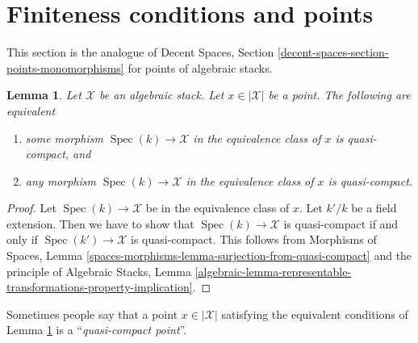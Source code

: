 \documentclass{stacks-project}
\theoremstyle{plain}
\newtheorem{lemma}[subsection]{Lemma}
\theoremstyle{definition}
\theoremstyle{remark}
\numberwithin{equation}{subsection}
\def\Spec{\mathop{\mathrm{Spec}}}
\begin{document}
\section{Finiteness conditions and points}
\label{section-points-conditions}

\noindent
This section is the analogue of
Decent Spaces, Section \ref{decent-spaces-section-points-monomorphisms}
for points of algebraic stacks.

\begin{lemma}
\label{lemma-UR-quasi-compact-above-x}
Let $\mathcal{X}$ be an algebraic stack. Let $x \in |\mathcal{X}|$
be a point. The following are equivalent
\begin{enumerate}
\item some morphism $\Spec(k) \to \mathcal{X}$ in the equivalence
class of $x$ is quasi-compact, and
\item any morphism $\Spec(k) \to \mathcal{X}$ in the equivalence
class of $x$ is quasi-compact.
\end{enumerate}
\end{lemma}

\begin{proof}
Let $\Spec(k) \to \mathcal{X}$ be in the equivalence
class of $x$. Let $k'/k$ be a field extension.
Then we have to show that $\Spec(k) \to \mathcal{X}$ is
quasi-compact if and only if $\Spec(k') \to \mathcal{X}$
is quasi-compact. This follows from
Morphisms of Spaces, Lemma
\ref{spaces-morphisms-lemma-surjection-from-quasi-compact}
and the principle of Algebraic Stacks, Lemma
\ref{algebraic-lemma-representable-transformations-property-implication}.
\end{proof}

\noindent
Sometimes people say that a point $x \in |\mathcal{X}|$ satisfying
the equivalent conditions of Lemma \ref{lemma-UR-quasi-compact-above-x}
is a ``{\it quasi-compact point}''.













\end{document}
